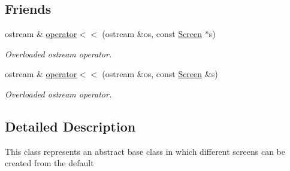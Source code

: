 \subsection*{Friends}
\begin{DoxyCompactItemize}
\item 
\hypertarget{classScreen_a9d1583ec176b804e06d7c6d2a8bf3bcd}{ostream \& \hyperlink{classScreen_a9d1583ec176b804e06d7c6d2a8bf3bcd}{operator$<$$<$} (ostream \&os, const \hyperlink{classScreen}{Screen} $\ast$s)}\label{classScreen_a9d1583ec176b804e06d7c6d2a8bf3bcd}

\begin{DoxyCompactList}\small\item\em Overloaded ostream operator. \end{DoxyCompactList}\item 
\hypertarget{classScreen_adb701ccee14124fb66506086b5a34199}{ostream \& \hyperlink{classScreen_adb701ccee14124fb66506086b5a34199}{operator$<$$<$} (ostream \&os, const \hyperlink{classScreen}{Screen} \&s)}\label{classScreen_adb701ccee14124fb66506086b5a34199}

\begin{DoxyCompactList}\small\item\em Overloaded ostream operator. \end{DoxyCompactList}\end{DoxyCompactItemize}


\subsection{Detailed Description}
This class represents an abstract base class in which different screens can be created from the default 

